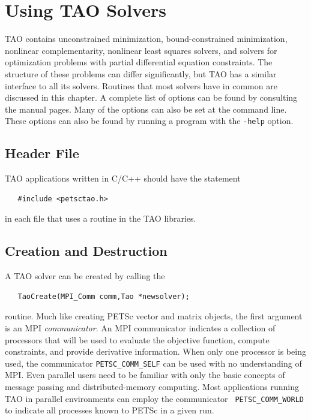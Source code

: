 \documentclass[]{book}
\begin{document}
\chapter{Using TAO Solvers}
\label{chapter_tao_solver}

TAO contains unconstrained minimization, bound-constrained minimization, 
nonlinear complementarity, nonlinear least squares solvers, and solvers
for optimization problems with partial differential equation constraints.
The structure of these problems can differ significantly, but TAO has a 
similar interface to all its solvers.  
Routines that most solvers have in common are discussed in 
this chapter.
A complete list of options can be found by consulting the manual pages.
Many of the options can also be set at the command line.  These options
can also be found by
running a program with the {\tt -help} option.

\section{Header File}

TAO applications written in C/C++ should have the statement 
\begin{verbatim}
   #include <petsctao.h>
\end{verbatim}
\noindent
in each file that uses a routine in the TAO libraries.


\section{Creation and Destruction}

A TAO solver can be created by calling the
\begin{verbatim}
   TaoCreate(MPI_Comm comm,Tao *newsolver);
\end{verbatim}
routine. 
Much like creating PETSc vector and matrix objects, 
the first argument is an MPI {\em communicator}.
An MPI \cite{using-mpi} communicator
indicates a collection of processors that will be used to evaluate the
objective function, compute constraints, and provide derivative information.
When only one processor is being used, the communicator {\tt PETSC\_COMM\_SELF}
can be used with no understanding of MPI.
Even parallel users need to be familiar with only the basic concepts 
of message passing and  distributed-memory computing. 
Most applications running TAO in
parallel environments can employ the communicator {\tt
PETSC\_COMM\_WORLD} to indicate all processes known to PETSc in a given run.
\end{document}
